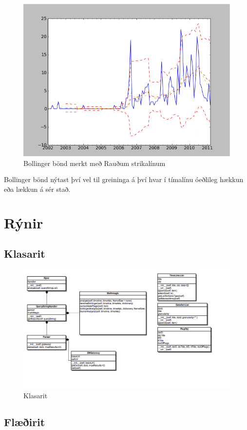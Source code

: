 \documentclass{article}
\begin{document}
\begin{figure}[H]
  \centering
  \includegraphics[width=.58\textwidth]{Bollinger.png} 
  \caption{Bollinger bönd merkt með Rauðum strikalínum} 
\end{figure}


Bollinger bönd nýtast því vel til greininga á því hvar í
tímalínu óeðlileg hækkun eða lækkun á sér stað.






\section{Rýnir}
\label{sec:implementation}

\subsection{Klasarit}
\label{sec:class_diagram}

\begin{figure}[H]
  \centering
  \includegraphics[width=.75\textwidth]{rynir_class_diagram.png} 
  \caption{Klasarit} 
\end{figure}

\subsection{Flæðirit}
\label{sec:flow_chart}
\end{document}
